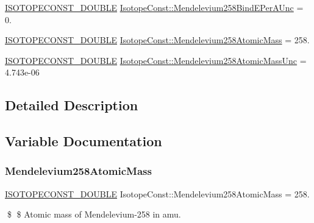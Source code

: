 \begin{DoxyCompactItemize}
\item 
\mbox{\hyperlink{group___isotope_const-_macros_ga8f45a7272ce02c0b4c65c44636ed719a}{I\+S\+O\+T\+O\+P\+E\+C\+O\+N\+S\+T\+\_\+\+D\+O\+U\+B\+LE}} \mbox{\hyperlink{group___isotope_const-_mendelevium-_md258_ga038086618bbd2be8caed86c00f519f1e}{Isotope\+Const\+::\+Mendelevium258\+Bind\+E\+Per\+A\+Unc}} = 0.
\item 
\mbox{\hyperlink{group___isotope_const-_macros_ga8f45a7272ce02c0b4c65c44636ed719a}{I\+S\+O\+T\+O\+P\+E\+C\+O\+N\+S\+T\+\_\+\+D\+O\+U\+B\+LE}} \mbox{\hyperlink{group___isotope_const-_mendelevium-_md258_ga80486700fefd6b0c8bc1bcc3f92b5fb5}{Isotope\+Const\+::\+Mendelevium258\+Atomic\+Mass}} = 258.
\item 
\mbox{\hyperlink{group___isotope_const-_macros_ga8f45a7272ce02c0b4c65c44636ed719a}{I\+S\+O\+T\+O\+P\+E\+C\+O\+N\+S\+T\+\_\+\+D\+O\+U\+B\+LE}} \mbox{\hyperlink{group___isotope_const-_mendelevium-_md258_ga22471021572092e280c7cbc33de66876}{Isotope\+Const\+::\+Mendelevium258\+Atomic\+Mass\+Unc}} = 4.\+743e-\/06
\end{DoxyCompactItemize}


\subsection{Detailed Description}


\subsection{Variable Documentation}
\mbox{\label{group___isotope_const-_mendelevium-_md258_ga80486700fefd6b0c8bc1bcc3f92b5fb5}} 
\subsubsection{\texorpdfstring{Mendelevium258\+Atomic\+Mass}{Mendelevium258AtomicMass}}
{\footnotesize\ttfamily \mbox{\hyperlink{group___isotope_const-_macros_ga8f45a7272ce02c0b4c65c44636ed719a}{I\+S\+O\+T\+O\+P\+E\+C\+O\+N\+S\+T\+\_\+\+D\+O\+U\+B\+LE}} Isotope\+Const\+::\+Mendelevium258\+Atomic\+Mass = 258.}

\$ \$ Atomic mass of Mendelevium-\/258 in amu. \mbox{\label{group___isotope_const-_mendelevium-_md258_ga22471021572092e280c7cbc33de66876}} 
